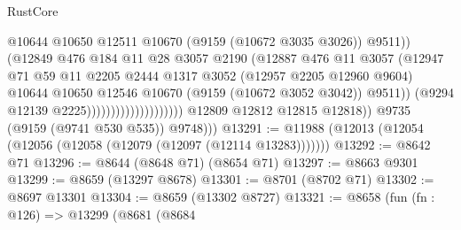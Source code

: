 \begin{lexlean}{RustCore}
\begin{coremodule}
                                                      @10644
                                                      @10650
                                                      @12511
                                                      @10670
                                                      (@9159 (@10672 @3035 @3026))
                                                      @9511))
                                                  (@12849
                                                    @476
                                                    @184
                                                    @11
                                                    @28
                                                    @3057
                                                    @2190
                                                    (@12887
                                                      @476
                                                      @11
                                                      @3057
                                                      (@12947
                                                        @71
                                                        @59
                                                        @11
                                                        @2205
                                                        @2444
                                                        @1317
                                                        @3052
                                                        (@12957 @2205 @12960 @9604)
                                                        @10644
                                                        @10650
                                                        @12546
                                                        @10670
                                                        (@9159 (@10672 @3052 @3042))
                                                        @9511))
                                                    (@9294 @12139 @2225))))))))))))))))))))
              @12809
              @12812
              @12815
              @12818))
          @9735
          (@9159 (@9741 @530 @535))
          @9748)))
@13291 := @11988 (@12013 (@12054 (@12056 (@12058 (@12079 (@12097 (@12114 @13283)))))))
@13292 := @8642 @71
@13296 := @8644 (@8648 @71) (@8654 @71)
@13297 := @8663 @9301
@13299 := @8659 (@13297 @8678)
@13301 := @8701 (@8702 @71)
@13302 := @8697 @13301
@13304 := @8659 (@13302 @8727)
@13321 := @8658
    (fun (fn : @126) =>
    @13299
      (@8681
        (@8684

\end{coremodule}
\end{lexlean}
